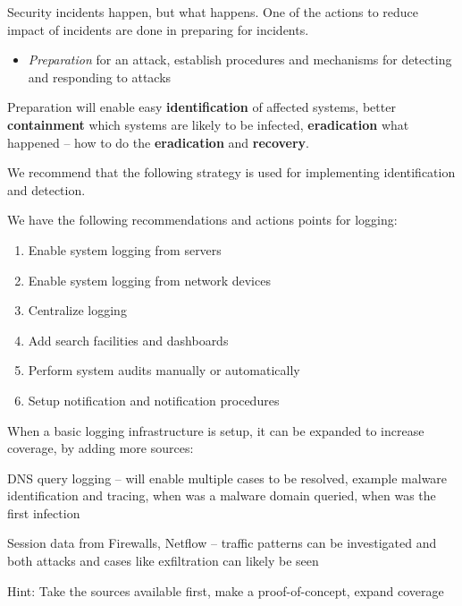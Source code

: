 \documentclass[Screen16to9,17pt]{foils}
\begin{document}


Security incidents happen, but what happens. One of the actions to reduce impact of incidents are done in preparing for incidents.

\begin{itemize}
\item \emph{Preparation} for an attack, establish procedures and mechanisms for detecting and responding to attacks
\end{itemize}

Preparation will enable easy {\bf identification} of affected systems, better {\bf containment} which systems are likely to be infected, {\bf eradication} what happened -- how to do the {\bf eradication} and {\bf recovery}.


We recommend that the following strategy is used for implementing identification and detection.

We have the following recommendations and actions points for logging:
\begin{enumerate}
\item[\faSquareO] Enable system logging from servers
\item[\faSquareO] Enable system logging from network devices
\item[\faSquareO] Centralize logging
\item[\faSquareO] Add search facilities and dashboards
\item[\faSquareO] Perform system audits manually or automatically
\item[\faSquareO] Setup notification and notification procedures
\end{enumerate}

When a basic logging infrastructure is setup, it can be expanded to increase coverage, by
adding more sources:

\begin{list2}
\item DNS query logging -- will enable multiple cases to be resolved, example malware identification and tracing, when was a malware domain queried, when was the first infection
\item Session data from Firewalls, Netflow -- traffic patterns can be investigated and both attacks and cases like exfiltration can likely be seen
\end{list2}

Hint: Take the sources available first, make a proof-of-concept, expand coverage
\end{document}
